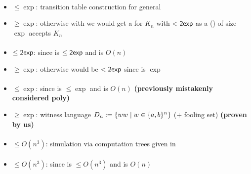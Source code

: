 \paragraph{\OMODLA{}\tto\ODFA}\label{cost:OM1DLAto1DFA}
\begin{itemize}
	\item $\le\exp$: transition table construction for general \OLA \cite{PigPis14}
	\item $\ge\exp$: otherwise with \hyperref[cost:OM1DLAto1DFA]{\OMODLA{}\tto\ODFA} we would get a \ODFA for $K_n$ with $<\mathsf{2exp}$ as a \OMODLA (\TDFA) of size $\exp$ accepts $K_n$
\end{itemize}
\paragraph{\OMOLA{}\tto\OMODLA}
\begin{itemize}
	\item $\le\mathsf{2exp}$: since \hyperref[cost:OM1LAto1DFA]{\OMOLA{}\tto\ODFA} is $\le\mathsf{2exp}$ and \ODFA{}\tto\OMODLA is $O(n)$
	\item $\ge\exp$: otherwise \hyperref[cost:OM1LAto1DFA]{\OMOLA{}\tto\ODFA} would be $<\mathsf{2exp}$ since \hyperref[cost:OM1DLAto1DFA]{\OMODLA{}\tto\ODFA} is $\exp$
\end{itemize}
\paragraph{\OMODLA{}\tto\ONFA}
\begin{itemize}
	\item $\le\exp$: since \hyperref[cost:OM1DLAto1DFA]{\OMODLA{}\tto\ODFA} is $\le\exp$ and \ODFA{}\tto\ONFA is $O(n)$ \textbf{(previously mistakenly considered poly)}
	\item $\ge\exp$: witness language $D_n:=\{ww\mid w\in\{a,b\}^n\}$ (\OMODLA + fooling set) \textbf{(proven by us)}
\end{itemize}
\paragraph{\OMODLA{}\tto\TDFA}\label{cost:OM1DLAto2DFA}
\begin{itemize}
	\item $\le O(n^3)$: simulation via computation trees given in \cite{PigPri23a}
\end{itemize}
\paragraph{\OMODLA{}\tto\TNFA}
\begin{itemize}
	\item $\le O(n^3)$: since \hyperref[cost:OM1DLAto2DFA]{\OMODLA{}\tto\TDFA} is $\le O(n^3)$ and \TDFA{}\tto\TNFA is $O(n)$
\end{itemize}
